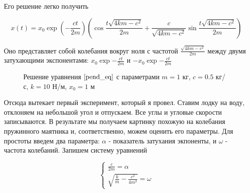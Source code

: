 \documentclass[12pt,a4paper]{article}
\begin{document}
Его решение легко получить

$$ x(t) = x_0 \exp\left(-\frac{ct}{2m}\right) \left( \cos\frac{t\sqrt{4km-c^2}}{2m} + \frac{c}{\sqrt{4km-c^2}} \sin\frac{t\sqrt{4km-c^2}}{2m} \right) $$

Оно представляет собой колебания вокруг ноля с частотой $\frac{\sqrt{4km-c^2}}{2m}$ между двумя затухающими экспонентами: $x_0 \exp{-\frac{ct}{2m}}$ и $-x_0 \exp{-\frac{ct}{2m}}$

\begin{figure}[h]
	\caption{Решение уравнения $\ref{pend_eq}$ с параметрами $m = 1$ кг, $c = 0.5$ кг/с, $k = 10$ Н/м, $x_0=1$ м}
\end{figure}

Отсюда вытекает первый эксперимент, который я провел. Ставим лодку на воду, отклоняем на небольшой угол и отпускаем. Все углы и угловые скорости записываются. В результате мы получаем картинку похожую на колебания пружинного маятника и, соответственно, можем оценить его параметры. Для простоты введем два параметра: $\alpha$ - показатель затухания экпоненты, и $\omega$ - частота колебаний. Запишем систему уравнений

\begin{equation*}
	\begin{cases}
		\frac{c}{2m} = \alpha
		\\
		\sqrt{\frac{k}{m} - \frac{c^2}{4m^2}} = \omega
	\end{cases}
\end{equation*}
\end{document}
